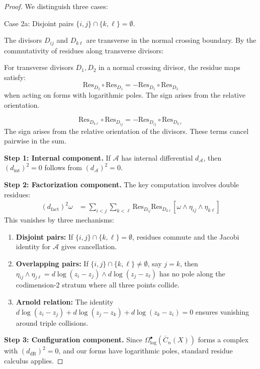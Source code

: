 \begin{proof}
We distinguish three cases:

Case 2a: Disjoint pairs $\{i,j\} \cap \{k,\ell\} = \emptyset$.

The divisors $D_{ij}$ and $D_{k\ell}$ are transverse in the normal crossing boundary. By the commutativity of residues along transverse divisors:

\begin{lemma}
For transverse divisors $D_1, D_2$ in a normal crossing divisor, the residue maps satisfy:
$$\text{Res}_{D_2} \circ \text{Res}_{D_1} = -\text{Res}_{D_1} \circ \text{Res}_{D_2}$$
when acting on forms with logarithmic poles. The sign arises from the relative orientation.
\end{lemma}
$$\text{Res}_{D_{k\ell}} \circ \text{Res}_{D_{ij}} = -\text{Res}_{D_{ij}} \circ \text{Res}_{D_{k\ell}}$$
The sign arises from the relative orientation of the divisors. These terms cancel pairwise in the sum.

\textbf{Step 1: Internal component.} 
If $\mathcal{A}$ has internal differential $d_\mathcal{A}$, then $(d_{\text{int}})^2 = 0$ follows from $(d_\mathcal{A})^2 = 0$.

\textbf{Step 2: Factorization component.}
The key computation involves double residues:
\begin{align}
(d_{\text{fact}})^2\omega &= \sum_{i<j} \sum_{k<\ell} \text{Res}_{D_{ij}} \text{Res}_{D_{k\ell}} [\omega \wedge \eta_{ij} \wedge \eta_{k\ell}]
\end{align}
This vanishes by three mechanisms:
\begin{enumerate}
\item \textbf{Disjoint pairs:} If $\{i,j\} \cap \{k,\ell\} = \emptyset$, residues commute and the Jacobi identity for $\mathcal{A}$ gives cancellation.
\item \textbf{Overlapping pairs:} If $\{i,j\} \cap \{k,\ell\} \neq \emptyset$, say $j = k$, then $\eta_{ij} \wedge \eta_{j\ell} = d\log(z_i - z_j) \wedge d\log(z_j - z_\ell)$ has no pole along the codimension-2 stratum where all three points collide.
\item \textbf{Arnold relation:} The identity $d\log(z_i - z_j) + d\log(z_j - z_k) + d\log(z_k - z_i) = 0$ ensures vanishing around triple collisions.
\end{enumerate}

\textbf{Step 3: Configuration component.}
Since $\Omega^\bullet_{\log}(\overline{C}_n(X))$ forms a complex with $(d_{\text{dR}})^2 = 0$, and our forms have logarithmic poles, standard residue calculus applies.


\end{proof}
